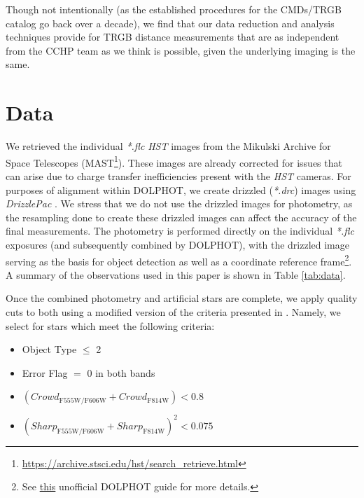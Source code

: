 \documentclass[twocolumn]{aastex62}
\begin{document}
Though not intentionally (as the established procedures for the CMDs/TRGB catalog go back over a decade), we find that our data reduction and analysis techniques provide for TRGB distance measurements that are as independent from the CCHP team as we think is possible, given the underlying imaging is the same.

\section{Data}

We retrieved the individual \textit{*.flc} \textit{HST} images from the Mikulski Archive for Space Telescopes (MAST\footnote{\url{https://archive.stsci.edu/hst/search_retrieve.html}}). These images are already corrected for issues that can arise due to charge transfer inefficiencies present with the \textit{HST} cameras. For purposes of alignment within DOLPHOT, we create drizzled (\textit{*.drc}) images using \textit{DrizzlePac} \citep{2015ASPC..495..281A}. We stress that we do not use the drizzled images for photometry, as the resampling done to create these drizzled images can affect the accuracy of the final measurements. The photometry is performed directly on the individual \textit{*.flc} exposures (and subsequently combined by DOLPHOT), with the drizzled image serving as the basis for object detection as well as a coordinate reference frame\footnote{See \href{https://physics.mcmaster.ca/Fac_Harris/dolphot_primer.txt}{this} unofficial DOLPHOT guide for more details.}. A summary of the observations used in this paper is shown in Table \ref{tab:data}.

Once the combined photometry and artificial stars are complete, we apply quality cuts to both using a modified version of the criteria presented in \cite{2017AJ....154...51M}. Namely, we select for stars which meet the following criteria:

\begin{itemize}
    \item Object Type $\le$ 2
    
    \item Error Flag $=$ 0 in both bands

    \item $(Crowd_{\mathrm{F555W/F606W}}+Crowd_{\mathrm{F814W}}) < 0.8$
    
    \item $(Sharp_{\mathrm{F555W/F606W}}+Sharp_{\mathrm{F814W}})^{2} < 0.075$
\end{itemize}
\end{document}
